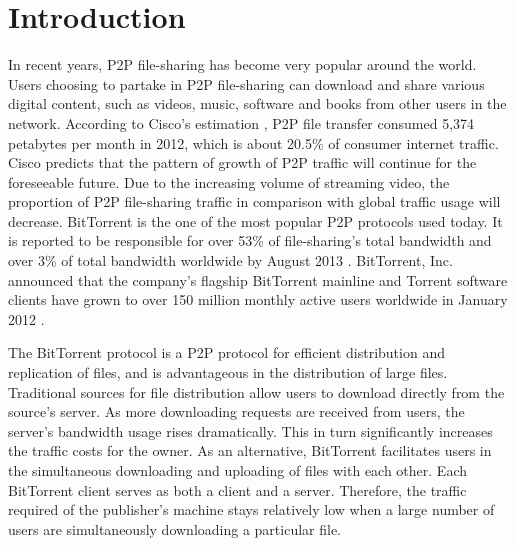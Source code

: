 \documentclass[conference]{IEEEtran}
\begin{document}
\section{Introduction}
In recent years, P2P file-sharing has become very popular around the world. Users choosing to partake in P2P file-sharing can download and share various digital content, such as videos, music, software and books from other users in the network. According to Cisco's estimation \cite{cisco}, P2P file transfer consumed 5,374 petabytes per month in 2012, which is about 20.5\% of consumer internet traffic. Cisco predicts that the pattern of growth of P2P traffic will continue for the foreseeable future. Due to the increasing volume of streaming video, the proportion of P2P file-sharing traffic in comparison with global traffic usage will decrease. BitTorrent is the one of the most popular P2P protocols used today. It is reported to be responsible for over 53\% of file-sharing's total bandwidth and over 3\% of total bandwidth worldwide by August 2013 \cite{paloalto}. BitTorrent, Inc. announced that the company's flagship BitTorrent mainline and Torrent software clients have grown to over 150 million monthly active users worldwide in January 2012 \cite{bt}.

The BitTorrent protocol \cite{btspec} is a P2P protocol for efficient distribution and replication of files, and is advantageous in the distribution of large files. Traditional sources for file distribution allow users to download directly from the source's server. As more downloading requests are received from users, the server's bandwidth usage rises dramatically. This in turn significantly increases the traffic costs for the owner. As an alternative, BitTorrent facilitates users in the simultaneous downloading and uploading of files with each other. Each BitTorrent client serves as both a client and a server. Therefore, the traffic required of the publisher's machine stays relatively low when a large number of users are simultaneously downloading a particular file. 
\end{document}
